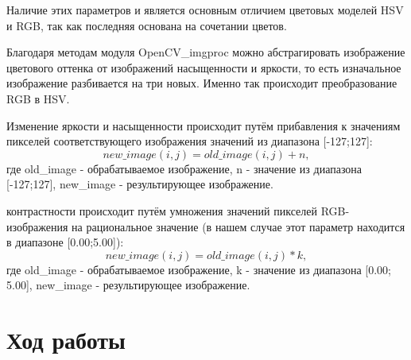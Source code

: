 \documentclass[12pt,a4paper]{scrartcl}
\begin{document}
Наличие этих параметров и является основным отличием цветовых моделей HSV и RGB, так как последняя основана на сочетании цветов.

Благодаря методам модуля OpenCV\_imgproc можно абстрагировать изображение цветового оттенка от изображений насыщенности и яркости, то есть изначальное изображение разбивается на три новых. Именно так происходит преобразование RGB в HSV. 

Изменение яркости и насыщенности происходит путём прибавления к значениям пикселей соответствующего изображения значений из диапазона [-127;127]: \[ new\_image(i,j) = old\_image(i,j) + n, \] где old\_image - обрабатываемое изображение, n - значение из диапазона [-127;127], new\_image - результирующее изображение.  

 контрастности происходит путём умножения значений пикселей RGB-изображения на рациональное значение (в нашем случае этот параметр находится в диапазоне [0.00;5.00]): \[ new\_image(i,j) = old\_image(i,j) * k, \] где old\_image - обрабатываемое изображение, k - значение из диапазона [0.00; 5.00], new\_image - результирующее изображение.  


\vfill
\newpage


\section{Ход работы}
\end{document}

